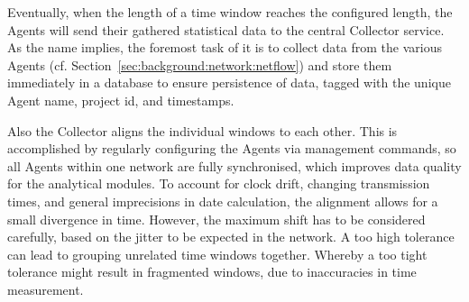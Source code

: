 Eventually, when the length of a time window reaches the configured length, the Agents will send their gathered statistical data to the central Collector service.
As the name implies, the foremost task of it is to collect data from the various Agents (cf. Section~\ref{sec:background:network:netflow}) and store them immediately in a database to ensure persistence of data, tagged with the unique Agent name, project id, and timestamps.

Also the Collector aligns the individual windows to each other. This is accomplished by regularly configuring the Agents via management commands, so all Agents within one network are fully synchronised, which improves data quality for the analytical modules. To account for clock drift, changing transmission times, and general imprecisions in date calculation, the alignment allows for a small divergence in time. However, the maximum shift has to be considered carefully, based on the jitter to be expected in the network.
A too high tolerance can lead to grouping unrelated time windows together. Whereby a too tight tolerance might result in fragmented windows, due to inaccuracies in time measurement.

